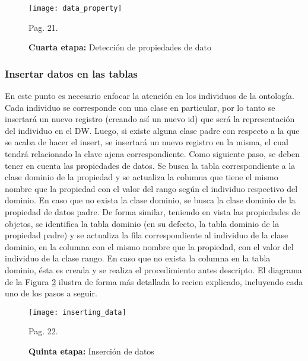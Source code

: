 \documentclass[a4paper,11pt]{article}
\begin{document}
\begin{flushleft}
    \begin{figure}[!htb]
      \begin{center}
        \texttt{[image: data\_property]}
        \caption{\textbf{Cuarta etapa:} Detección de propiedades de dato} \cite{ontologias} Pag. 21.
        \label{dataProperty}
      \end{center}
    \end{figure}
    
    
    \subsubsection{Insertar datos en las tablas}
    
    En este punto es necesario enfocar la atención en los individuos de la ontología. Cada individuo se corresponde con una clase en particular, por lo tanto se
    insertará un nuevo registro (creando así un nuevo id) que será la representación del individuo en el DW. Luego, si existe alguna clase padre con respecto a la
    que se acaba de hacer el insert, se insertará un nuevo registro en la misma, el cual tendrá relacionado la clave ajena correspondiente. Como siguiente paso,
    se deben tener en cuenta las propiedades de datos. Se busca la tabla correspondiente a la clase dominio de la propiedad y se actualiza la columna que tiene el
    mismo nombre que la propiedad con el valor del rango según el individuo respectivo del dominio. En caso que no exista la clase dominio, se busca la clase
    dominio de la propiedad de datos padre. De forma similar, teniendo en vista las propiedades de objetos,  se identifica la tabla dominio (en su defecto, la 
    tabla dominio de la propiedad padre) y se actualiza la fila correspondiente al individuo de la clase dominio, en la columna con el mismo nombre que la
    propiedad, con el valor del individuo de la clase rango. En caso que no exista la columna en la tabla dominio, ésta es creada y se realiza el procedimiento
    antes descripto. El diagrama de la Figura \ref{insertingData} ilustra de forma más detallada lo recien explicado, incluyendo cada uno de los pasos a seguir.
    
    \begin{figure}[!htb]
      \begin{center}
        \texttt{[image: inserting\_data]}
        \caption{\textbf{Quinta etapa:} Inserción de datos} \cite{ontologias} Pag. 22.
        \label{insertingData}
      \end{center}
    \end{figure}
    

\end{flushleft}
\end{document}
